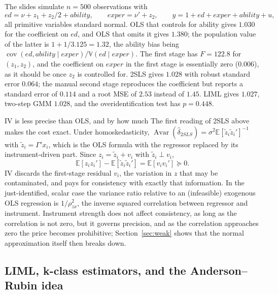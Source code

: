 \documentclass[11pt,a4paper]{article}
\newcommand{\E}{\mathbb{E}}
\newcommand{\V}{\mathbb{V}}
\newcommand{\Cov}{\operatorname{cov}}
\newcommand{\Avar}{\operatorname{Avar}}
\newcommand{\dhat}{\hat\delta}
\begin{document}
\begin{example}
The slides simulate $n=500$ observations with
\[
ed=\nu+z_1+z_2/2+ability,\qquad exper=\nu'+z_2,\qquad y=1+ed+exper+ability+u,
\]
all primitive variables standard normal. OLS that controls for ability gives $1.030$ for the coefficient on $ed$, and OLS that omits it gives $1.380$; the population value of the latter is $1+1/3.125=1.32$, the ability bias being $\Cov(ed,ability\mid exper)/\V(ed\mid exper)$. The first stage has $F=122.8$ for $(z_1,z_2)$, and the coefficient on $exper$ in the first stage is essentially zero ($0.006$), as it should be once $z_2$ is controlled for. 2SLS gives $1.028$ with robust standard error $0.064$; the manual second stage reproduces the coefficient but reports a standard error of $0.114$ and a root MSE of $2.53$ instead of $1.45$. LIML gives $1.027$, two-step GMM $1.028$, and the overidentification test has $p=0.448$.
\end{example}

\begin{whybox}{IV is less precise than OLS, and by how much}
The first reading of 2SLS above makes the cost exact. Under homoskedasticity, $\Avar(\dhat_{2SLS})=\sigma^2\E[\tilde z_i\tilde z_i']^{-1}$ with $\tilde z_i=\Gamma'x_i$, which is the OLS formula with the regressor replaced by its instrument-driven part. Since $z_i=\tilde z_i+v_i$ with $\tilde z_i\perp v_i$,
\[
\E[z_iz_i']-\E[\tilde z_i\tilde z_i']=\E[v_iv_i']\succeq0 .
\]
IV discards the first-stage residual $v_i$, the variation in $z$ that may be contaminated, and pays for consistency with exactly that information. In the just-identified, scalar case the variance ratio relative to an (infeasible) exogenous OLS regression is $1/\rho_{zx}^2$, the inverse squared correlation between regressor and instrument. Instrument strength does not affect consistency, as long as the correlation is not zero, but it governs precision, and as the correlation approaches zero the price becomes prohibitive; Section~\ref{sec:weak} shows that the normal approximation itself then breaks down.
\end{whybox}

\subsection{LIML, k-class estimators, and the Anderson--Rubin idea}\label{sec:liml}
\end{document}
